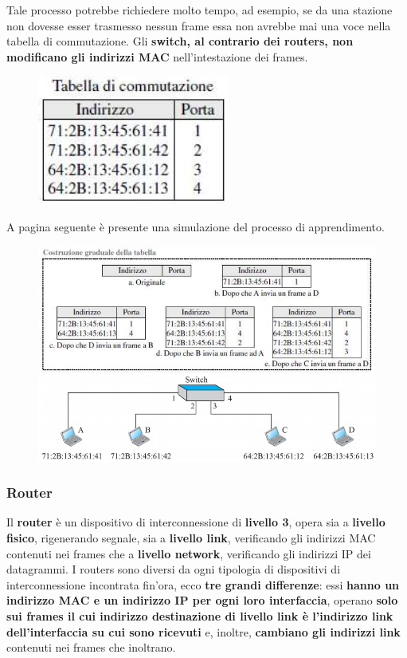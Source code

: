 \documentclass[11pt,a4paper,oneside]{book}
\theoremstyle{definition}
\begin{document}
Tale processo potrebbe richiedere molto tempo, ad esempio, se da una stazione non dovesse esser trasmesso nessun frame essa non avrebbe mai una voce nella tabella di commutazione. Gli \textbf{switch, al contrario dei routers, non modificano gli indirizzi MAC} nell'intestazione dei frames.

\begin{figure}[!h]
	\includegraphics[scale=0.5]{Immagini/Comm_table.png}
	\centering
\end{figure}

A pagina seguente è presente una simulazione del processo di apprendimento.

\pagebreak

\begin{figure}[!h]
	\includegraphics[scale=0.4]{Immagini/Apprendimento.png}
	\centering
\end{figure}

\subsubsection{Router}
Il \textbf{router} è un dispositivo di interconnessione di \textbf{livello 3}, opera sia a \textbf{livello fisico}, rigenerando segnale, sia a \textbf{livello link}, verificando gli indirizzi MAC contenuti nei frames che a \textbf{livello network}, verificando gli indirizzi IP dei datagrammi. I routers sono diversi da ogni tipologia di dispositivi di interconnessione incontrata fin'ora, ecco \textbf{tre grandi differenze}:  essi \textbf{hanno un indirizzo MAC e un indirizzo IP per ogni loro interfaccia}, operano \textbf{solo sui frames il cui indirizzo destinazione di livello link è l’indirizzo link dell’interfaccia su cui sono ricevuti} e, inoltre, \textbf{cambiano gli indirizzi link} contenuti nei frames che inoltrano.
\end{document}
